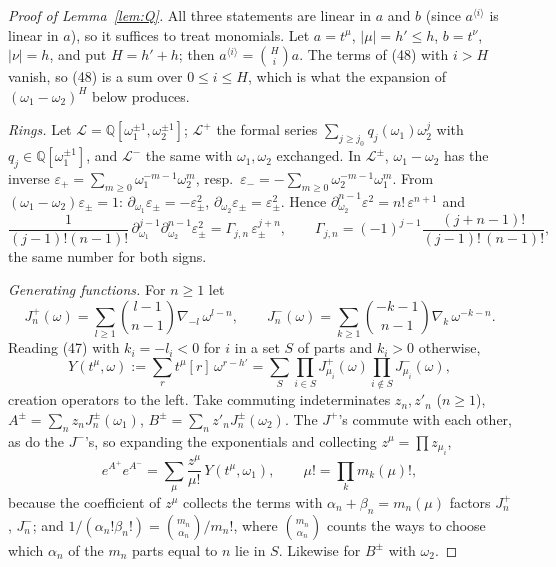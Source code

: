 \documentclass[11pt]{amsart}
\theoremstyle{remark}
\newcommand{\Q}{\mathbb{Q}}
\newcommand{\cL}{\mathcal{L}}
\begin{document}
\begin{proof}[Proof of Lemma~\ref{lem:Q}]
All three statements are linear in $a$ and $b$ (since $a^{\langle i\rangle}$ is linear in $a$), so it suffices to
treat monomials. Let $a=t^\mu$, $|\mu|=h'\le h$, $b=t^\nu$, $|\nu|=h$, and put $H=h'+h$; then
$a^{\langle i\rangle}=\binom Hi a$. The terms of (48) with $i>H$ vanish, so (48) is a sum over $0\le i\le H$, which is
what the expansion of $(\omega_1-\omega_2)^H$ below produces.

\emph{Rings.} Let $\cL=\Q[\omega_1^{\pm1},\omega_2^{\pm1}]$; $\cL^+$ the formal series $\sum_{j\ge j_0}q_j(\omega_1)\omega_2^j$ with
$q_j\in\Q[\omega_1^{\pm1}]$, and $\cL^-$ the same with $\omega_1,\omega_2$ exchanged. In $\cL^\pm$, $\omega_1-\omega_2$ has
the inverse $\varepsilon_+=\sum_{m\ge0}\omega_1^{-m-1}\omega_2^m$, resp.\ $\varepsilon_-=-\sum_{m\ge0}\omega_2^{-m-1}\omega_1^m$.
From $(\omega_1-\omega_2)\varepsilon_\pm=1$: $\partial_{\omega_1}\varepsilon_\pm=-\varepsilon_\pm^2$, $\partial_{\omega_2}\varepsilon_\pm=\varepsilon_\pm^2$.
Hence $\partial_{\omega_2}^{n-1}\varepsilon^2=n!\,\varepsilon^{n+1}$ and
\begin{equation}\tag{49}
\frac{1}{(j-1)!(n-1)!}\,\partial_{\omega_1}^{j-1}\partial_{\omega_2}^{n-1}\varepsilon_\pm^2=\Gamma_{j,n}\,\varepsilon_\pm^{j+n},\qquad
\Gamma_{j,n}=(-1)^{j-1}\frac{(j+n-1)!}{(j-1)!\,(n-1)!},
\end{equation}
the same number for both signs.

\emph{Generating functions.} For $n\ge1$ let
\[J^+_n(\omega)=\sum_{l\ge1}\binom{l-1}{n-1}\nabla_{-l}\,\omega^{l-n},\qquad
J^-_n(\omega)=\sum_{k\ge1}\binom{-k-1}{n-1}\nabla_k\,\omega^{-k-n}.\]
Reading (47) with $k_i=-l_i<0$ for $i$ in a set $S$ of parts and $k_i>0$ otherwise,
\[Y(t^\mu,\omega):=\sum_r t^\mu[r]\,\omega^{r-h'}=\sum_{S}\prod_{i\in S}J^+_{\mu_i}(\omega)\prod_{i\notin S}J^-_{\mu_i}(\omega),\]
creation operators to the left. Take commuting indeterminates $z_n,z'_n$ ($n\ge1$),
$A^\pm=\sum_nz_nJ^\pm_n(\omega_1)$, $B^\pm=\sum_nz'_nJ^\pm_n(\omega_2)$. The $J^+$'s commute with each other, as do the
$J^-$'s, so expanding the exponentials and collecting $z^\mu=\prod z_{\mu_i}$,
\[e^{A^+}e^{A^-}=\sum_\mu \frac{z^\mu}{\mu!}\,Y(t^\mu,\omega_1),\qquad \mu!=\prod_km_k(\mu)!,\]
because the coefficient of $z^\mu$ collects the terms with $\alpha_n+\beta_n=m_n(\mu)$ factors $J^+_n$, $J^-_n$;
and $1/(\alpha_n!\beta_n!)=\binom{m_n}{\alpha_n}/m_n!$, where $\binom{m_n}{\alpha_n}$ counts the ways to choose which
$\alpha_n$ of the $m_n$ parts equal to $n$ lie in $S$. Likewise for $B^\pm$ with $\omega_2$.


\end{proof}
\end{document}
